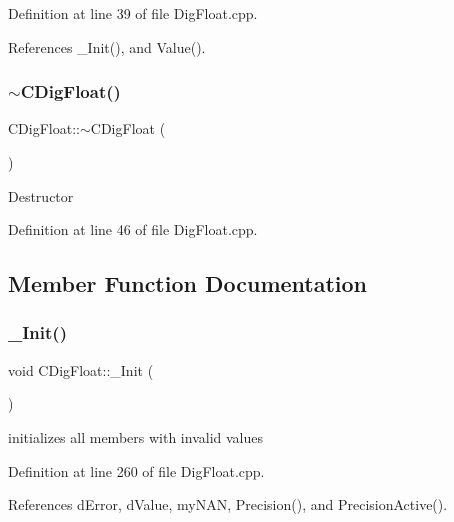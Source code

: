 Definition at line 39 of file Dig\+Float.\+cpp.



References \+\_\+\+Init(), and Value().

\mbox{\label{classCDigFloat_adfee37b740660ebebcca8a088554e342}} 
\subsubsection{\texorpdfstring{$\sim$\+C\+Dig\+Float()}{~CDigFloat()}}
{\footnotesize\ttfamily C\+Dig\+Float\+::$\sim$\+C\+Dig\+Float (\begin{DoxyParamCaption}{ }\end{DoxyParamCaption})}

Destructor 

Definition at line 46 of file Dig\+Float.\+cpp.



\subsection{Member Function Documentation}
\mbox{\label{classCDigFloat_a89a0dda21c74c115ac41b432031666a6}} 
\subsubsection{\texorpdfstring{\+\_\+\+Init()}{\_Init()}}
{\footnotesize\ttfamily void C\+Dig\+Float\+::\+\_\+\+Init (\begin{DoxyParamCaption}{ }\end{DoxyParamCaption})\hspace{0.3cm}{\ttfamily [protected]}}



initializes all members with invalid values 



Definition at line 260 of file Dig\+Float.\+cpp.



References d\+Error, d\+Value, my\+N\+AN, Precision(), and Precision\+Active().

\mbox{\label{classCDigFloat_a006a43f81560e2429dce9aca7742a4e7}} 

